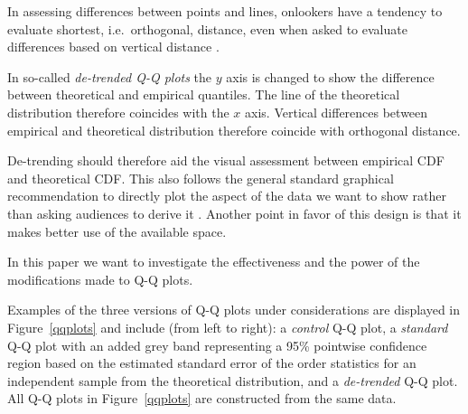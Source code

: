 \documentclass{article}\usepackage[]{graphicx}\usepackage[]{color}
\newcommand{\alnote}[1]{\todo[inline,color=green!40]{#1}}
\begin{document}
In assessing differences between points and lines, onlookers have a tendency to evaluate shortest, i.e.~orthogonal, distance, even when asked to evaluate differences based on vertical distance \citep{sineillusion, robbins:2005, cleveland:1984}. 

In so-called {\it de-trended Q-Q plots} the $y$ axis is changed to show the difference between theoretical and empirical quantiles. The line of the theoretical distribution therefore coincides with the $x$ axis. Vertical differences between empirical and theoretical distribution therefore  coincide with orthogonal distance. 

De-trending should therefore aid the visual assessment between empirical CDF and theoretical CDF. This also follows the general standard graphical recommendation to directly plot the aspect of the data we want to show rather than asking audiences to derive it \citep{wainer:2000}.  Another point in favor of this design is that it makes better use of the available space.



In this paper we want to investigate the effectiveness and the power of the modifications made to Q-Q plots.


Examples of the three versions of Q-Q plots under considerations are displayed in Figure~\ref{qqplots} and include (from left to right): a \emph{control} Q-Q plot, a \emph{standard} Q-Q plot with an added grey band representing a 95\% pointwise confidence region \citep{atkinson}
based on the estimated standard error of the order statistics for an independent sample from the theoretical distribution, and a \emph{de-trended} Q-Q plot. All Q-Q plots in Figure~\ref{qqplots} are constructed from the same data. 
\end{document}
